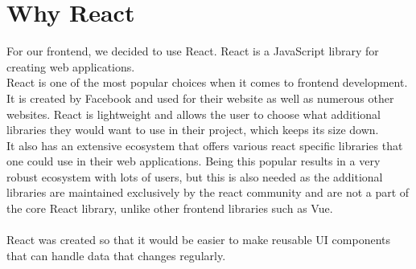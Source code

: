 \section{Why React}
For our frontend, we decided to use React.
React is a JavaScript library for creating web applications\cite{ReactJS}. 
\\
React is one of the most popular choices when it comes to frontend development\cite{NPMVueReactAngular}.
It is created by Facebook and used for their website as well as numerous other websites\cite{ReactHistory}.
React is lightweight and allows the user to choose what additional libraries they would want to use in their project, which keeps its size down.
\\
It also has an extensive ecosystem that offers various react specific libraries that one could use in their web applications.
Being this popular results in a very robust ecosystem with lots of users, but this is also needed as the additional libraries are maintained exclusively by the react community and are not a part of the core React library, unlike other frontend libraries such as Vue\cite{Vue}.
\\\\
React was created so that it would be easier to make reusable UI components that can handle data that changes regularly\cite{ReactHistory}.
